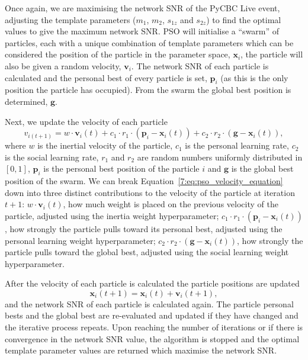 Once again, we are maximising the network SNR of the PyCBC Live event, adjusting the template parameters ($m_{1}$, $m_{2}$, $s_{1z}$ and $s_{2z}$) to find the optimal values to give the maximum network SNR. PSO will initialise a ``swarm'' of particles, each with a unique combination of template parameters which can be considered the position of the particle in the parameter space, $\mathbf{x}_{i}$, the particle will also be given a random velocity, $\mathbf{v}_{i}$. The network SNR of each particle is calculated and the personal best of every particle is set, $\textbf{p}_{i}$ (as this is the only position the particle has occupied). From the swarm the global best position is determined, $\textbf{g}$.

Next, we update the velocity of each particle
%
\begin{equation}
    v_{i(t+1)} = w \cdot \mathbf{v}_i(t) + c_1 \cdot r_1 \cdot (\mathbf{p}_i - \mathbf{x}_i(t)) + c_2 \cdot r_2 \cdot (\mathbf{g} - \mathbf{x}_i(t)),
    \label{7:eq:pso_velocity_equation}
\end{equation}
%
where $w$ is the inertial velocity of the particle, $c_{1}$ is the personal learning rate, $c_{2}$ is the social learning rate, $r_{1}$ and $r_{2}$ are random numbers uniformly distributed in $\left[0, 1\right]$, $\textbf{p}_{i}$ is the personal best position of the particle $i$ and $\textbf{g}$ is the global best position of the swarm. We can break Equation~\ref{7:eq:pso_velocity_equation} down into three distinct contributions to the velocity of the particle at iteration $t + 1$: $w \cdot \textbf{v}_{i}(t)$, how much weight is placed on the previous velocity of the particle, adjusted using the inertia weight hyperparameter; $c_{1} \cdot r_{1} \cdot \left(\textbf{p}_{i} - \textbf{x}_{i}(t)\right)$, how strongly the particle pulls toward its personal best, adjusted using the personal learning weight hyperparameter; $c_{2} \cdot r_{2} \cdot \left(\textbf{g} - \textbf{x}_{i}(t)\right)$, how strongly the particle pulls toward the global best, adjusted using the social learning weight hyperparameter.

After the velocity of each particle is calculated the particle positions are updated
%
\begin{equation}
    \mathbf{x}_i(t+1) = \mathbf{x}_i(t) + \mathbf{v}_i(t+1),
\end{equation}
%
and the network SNR of each particle is calculated again. The particle personal bests and the global best are re-evaluated and updated if they have changed and the iterative process repeats. Upon reaching the number of iterations or if there is convergence in the network SNR value, the algorithm is stopped and the optimal template parameter values are returned which maximise the network SNR.

